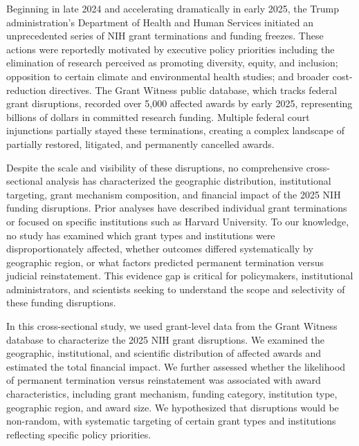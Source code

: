 \documentclass[10pt, letterpaper]{article}
\begin{document}
Beginning in late 2024 and accelerating dramatically in early 2025, the Trump administration's Department of Health and Human Services initiated an unprecedented series of NIH grant terminations and funding freezes.\cite{kaiser2025nih,sciencemag2025funding} These actions were reportedly motivated by executive policy priorities including the elimination of research perceived as promoting diversity, equity, and inclusion; opposition to certain climate and environmental health studies; and broader cost-reduction directives.\cite{greenberg2025doge,apnews2025grants} The Grant Witness public database, which tracks federal grant disruptions, recorded over 5,000 affected awards by early 2025, representing billions of dollars in committed research funding. Multiple federal court injunctions partially stayed these terminations, creating a complex landscape of partially restored, litigated, and permanently cancelled awards.\cite{aaas2025court,sciencemag2025court}

Despite the scale and visibility of these disruptions, no comprehensive cross-sectional analysis has characterized the geographic distribution, institutional targeting, grant mechanism composition, and financial impact of the 2025 NIH funding disruptions. Prior analyses have described individual grant terminations or focused on specific institutions such as Harvard University.\cite{harvardgazette2025funding,columbia2025capitulation} To our knowledge, no study has examined which grant types and institutions were disproportionately affected, whether outcomes differed systematically by geographic region, or what factors predicted permanent termination versus judicial reinstatement. This evidence gap is critical for policymakers, institutional administrators, and scientists seeking to understand the scope and selectivity of these funding disruptions.

In this cross-sectional study, we used grant-level data from the Grant Witness database to characterize the 2025 NIH grant disruptions. We examined the geographic, institutional, and scientific distribution of affected awards and estimated the total financial impact. We further assessed whether the likelihood of permanent termination versus reinstatement was associated with award characteristics, including grant mechanism, funding category, institution type, geographic region, and award size. We hypothesized that disruptions would be non-random, with systematic targeting of certain grant types and institutions reflecting specific policy priorities.
\end{document}
